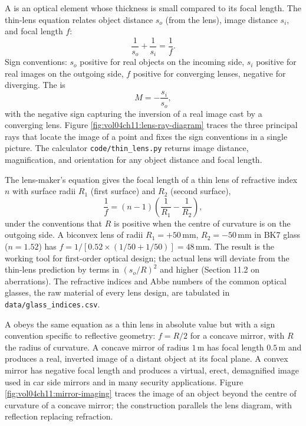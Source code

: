 

A  is an optical element whose thickness is small
compared to its focal length. The thin-lens equation relates object
distance $s_{o}$ (from the lens), image distance $s_{i}$, and focal
length $f$:
\[
\frac{1}{s_{o}} + \frac{1}{s_{i}} = \frac{1}{f}.
\]
Sign conventions: $s_{o}$ positive for real objects on the incoming
side, $s_{i}$ positive for real images on the outgoing side,
$f$ positive for converging lenses, negative for diverging. The
 is
\[
M = -\frac{s_{i}}{s_{o}},
\]
with the negative sign capturing the inversion of a real image cast
by a converging lens. Figure \ref{fig:vol04ch11:lens-ray-diagram}
traces the three principal rays that locate the image of a point and
fixes the sign conventions in a single picture. The calculator
\texttt{code/thin\_lens.py} returns image distance, magnification, and
orientation for any object distance and focal length.



The lens-maker's equation gives the focal length of a thin lens of
refractive index $n$ with surface radii $R_{1}$ (first surface) and
$R_{2}$ (second surface),
\[
\frac{1}{f} = (n-1)\left(\frac{1}{R_{1}} - \frac{1}{R_{2}}\right),
\]
under the conventions that $R$ is positive when the centre of
curvature is on the outgoing side. A biconvex lens of radii $R_{1} =
+50\,\si{\milli\meter}$, $R_{2} = -50\,\si{\milli\meter}$ in BK7 glass
($n = 1.52$) has $f = 1/[0.52\times(1/50 + 1/50)] = 48\,\si{\milli
\meter}$. The result is the working tool for first-order optical
design; the actual lens will deviate from the thin-lens prediction
by terms in $(s_{o}/R)^{2}$ and higher (Section 11.2 on aberrations).
The refractive indices and Abbe numbers of the common optical glasses,
the raw material of every lens design, are tabulated in
\texttt{data/glass\_indices.csv}.

A  obeys the same equation as a thin lens
in absolute value but with a sign convention specific to reflective
geometry: $f = R/2$ for a concave mirror, with $R$ the radius of
curvature. A concave mirror of radius $1\,\si{\meter}$ has focal
length $0.5\,\si{\meter}$ and produces a real, inverted image of a
distant object at its focal plane. A convex mirror has negative
focal length and produces a virtual, erect, demagnified image used in
car side mirrors and in many security applications. Figure
\ref{fig:vol04ch11:mirror-imaging} traces the image of an object beyond
the centre of curvature of a concave mirror; the construction parallels
the lens diagram, with reflection replacing refraction.

